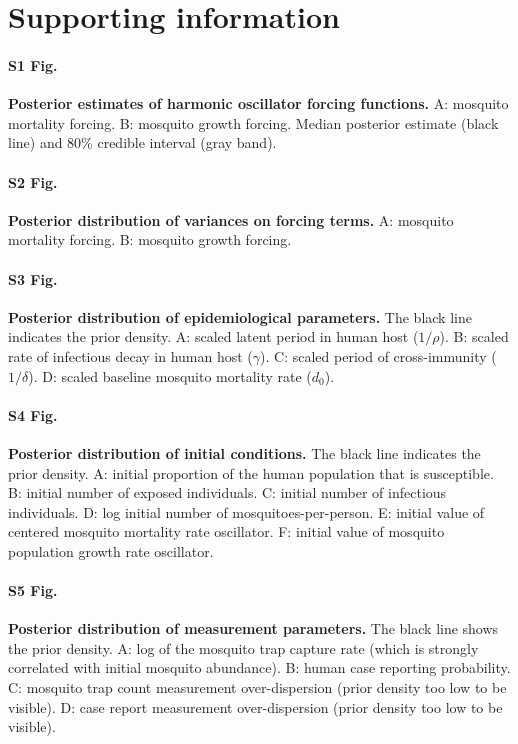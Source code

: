 \documentclass[10pt,letterpaper]{article}
\begin{document}
\section*{Supporting information}

\paragraph*{S1 Fig.}
\label{S1_fig}
{\bf Posterior estimates of harmonic oscillator forcing functions.} A: mosquito mortality forcing. B: mosquito growth forcing.  Median posterior estimate (black line) and 80\% credible interval (gray band).

\paragraph*{S2 Fig.}
\label{S2_fig}
{\bf Posterior distribution of variances on forcing terms.} A: mosquito mortality forcing. B: mosquito growth forcing.

\paragraph*{S3 Fig.}
\label{S3_fig}
{\bf Posterior distribution of epidemiological parameters.}  The black line indicates the prior density. A: scaled latent period in human host ($1/\rho$). B: scaled rate of infectious decay in human host ($\gamma$). C: scaled period of cross-immunity ($1/\delta$). D: scaled baseline mosquito mortality rate ($d_0$).

\paragraph*{S4 Fig.}
\label{S4_fig}
{\bf Posterior distribution of initial conditions.} The black line indicates the prior density. A: initial proportion of the human population that is susceptible. B: initial number of exposed individuals. C: initial number of infectious individuals. D: log initial number of mosquitoes-per-person. E: initial value of centered mosquito mortality rate oscillator. F: initial value of mosquito population growth rate oscillator.

\paragraph*{S5 Fig.}
\label{S5_fig}
{\bf Posterior distribution of measurement parameters.} The black line shows the prior density. A: log of the mosquito trap capture rate (which is strongly correlated with initial mosquito abundance). B: human case reporting probability. C: mosquito trap count measurement over-dispersion (prior density too low to be visible). D: case report measurement over-dispersion (prior density too low to be visible).
\end{document}
